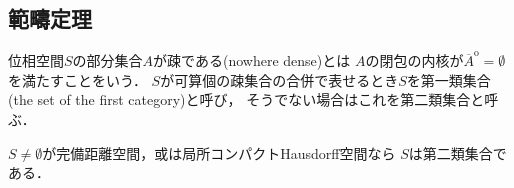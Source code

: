 \subsection{範疇定理}
	\begin{screen}
		\begin{dfn}
			位相空間$S$の部分集合$A$が疎である(nowhere dense)とは
			$A$の閉包の内核が$\overline{A}^{\mathrm{o}} = \emptyset$を満たすことをいう．
			$S$が可算個の疎集合の合併で表せるとき$S$を第一類集合(the set of the first category)と呼び，
			そうでない場合はこれを第二類集合と呼ぶ．
		\end{dfn}
	\end{screen}
	
	\begin{screen}
		\begin{thm}[Baire]\label{thm:Baire_category_theorem}
			$S \neq \emptyset$が完備距離空間，或は局所コンパクトHausdorff空間なら
			$S$は第二類集合である．
		\end{thm}
	\end{screen}
	
